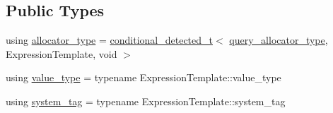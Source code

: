 \subsection*{Public Types}
\begin{DoxyCompactItemize}
\item 
using \hyperlink{classBC_1_1tensors_1_1Tensor__Base_a35ddc7a09653b3c775eee73f04247651}{allocator\+\_\+type} = \hyperlink{namespaceBC_1_1meta_a96ed28f49a8ffe8f0bae28da99e6ee18}{conditional\+\_\+detected\+\_\+t}$<$ \hyperlink{namespaceBC_1_1meta_ab8436259bffb6e3c72b402744e6dc707}{query\+\_\+allocator\+\_\+type}, Expression\+Template, void $>$
\item 
using \hyperlink{classBC_1_1tensors_1_1Tensor__Base_ae87e17ad59d882fd58df3f010e3712f5}{value\+\_\+type} = typename Expression\+Template\+::value\+\_\+type
\item 
using \hyperlink{classBC_1_1tensors_1_1Tensor__Base_aad47d019752237ceaf9e0e7e4b27d630}{system\+\_\+tag} = typename Expression\+Template\+::system\+\_\+tag
\end{DoxyCompactItemize}
